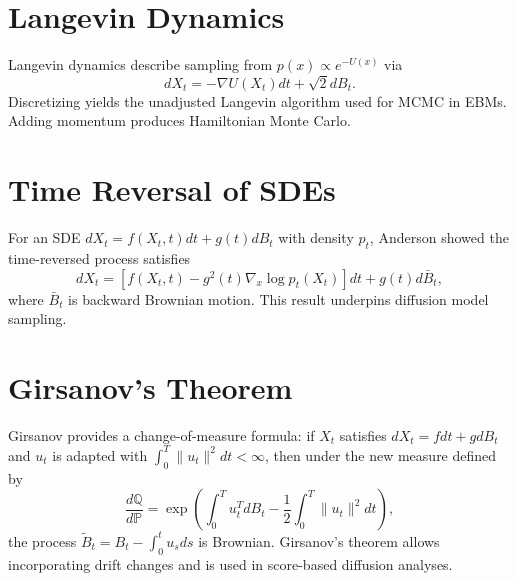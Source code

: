 \section{Langevin Dynamics}
Langevin dynamics describe sampling from $p(x)\propto e^{-U(x)}$ via
\begin{equation}
dX_t = -\nabla U(X_t) dt + \sqrt{2} dB_t.
\end{equation}
Discretizing yields the unadjusted Langevin algorithm used for MCMC in EBMs. Adding momentum produces Hamiltonian Monte Carlo.

\section{Time Reversal of SDEs}
For an SDE $dX_t=f(X_t,t)dt+g(t)dB_t$ with density $p_t$, Anderson \cite{anderson1982} showed the time-reversed process satisfies
\begin{equation}
dX_t = \left[f(X_t,t)-g^2(t)\nabla_x \log p_t(X_t)\right]dt + g(t) d\bar{B}_t,
\end{equation}
where $\bar{B}_t$ is backward Brownian motion. This result underpins diffusion model sampling.

\section{Girsanov's Theorem}
Girsanov \cite{girsanov1960} provides a change-of-measure formula: if $X_t$ satisfies $dX_t = f dt + g dB_t$ and $u_t$ is adapted with $\int_0^T \|u_t\|^2 dt < \infty$, then under the new measure defined by
\begin{equation}
\frac{d\mathbb{Q}}{d\mathbb{P}} = \exp\left(\int_0^T u_t^T dB_t - \frac12\int_0^T \|u_t\|^2 dt\right),
\end{equation}
the process $\tilde{B}_t = B_t - \int_0^t u_s ds$ is Brownian. Girsanov's theorem allows incorporating drift changes and is used in score-based diffusion analyses.

